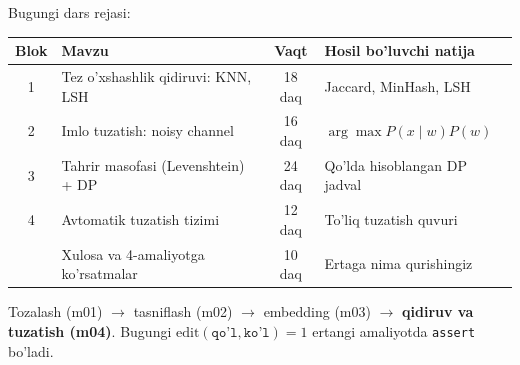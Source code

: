 \documentclass[aspectratio=169,11pt]{beamer}
\begin{document}
\begin{frame}{Bugungi dars rejasi:}
  \begin{center}
  \small
  \begin{tabular}{c p{5.0cm} c p{3.2cm}}
    \toprule
    \textbf{Blok}& \textbf{Mavzu} & \textbf{Vaqt} & \textbf{Hosil bo'luvchi natija}\\
    \midrule
    1 & Tez o'xshashlik qidiruvi: KNN, LSH & 18 daq & Jaccard, MinHash, LSH \\
    2 & Imlo tuzatish: noisy channel & 16 daq & $\arg\max P(x{\mid}w)P(w)$ \\
    3 & Tahrir masofasi (Levenshtein) + DP & 24 daq & Qo'lda hisoblangan DP jadval \\
    4 & Avtomatik tuzatish tizimi & 12 daq & To'liq tuzatish quvuri \\
    \midrule
      & Xulosa va 4-amaliyotga ko'rsatmalar & 10 daq & Ertaga nima qurishingiz \\
    \bottomrule
  \end{tabular}
  \end{center}
  \vspace{4pt}
  \begin{tcolorbox}[warnbox,title=Bu dars 1-haftaning yakuni]
    \footnotesize\sloppy
    Tozalash (m01) $\to$ tasniflash (m02) $\to$ embedding (m03) $\to$
    \textbf{qidiruv va tuzatish (m04)}. Bugungi $\text{edit}(\texttt{qo'l},\texttt{ko'l})=1$
    ertangi amaliyotda \texttt{assert} bo'ladi.
  \end{tcolorbox}
\end{frame}
\end{document}
